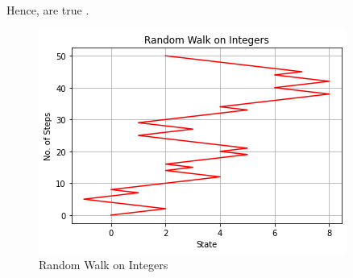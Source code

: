 \documentclass[journal,12pt,twocolumn]{IEEEtran}
\begin{document}
Hence,  are true .

\begin{figure}[!ht]
\centering
\includegraphics[width=\columnwidth]{Figure18}
\caption{Random Walk on Integers}
\label{Random Walk}	
\end{figure}
\end{document}
